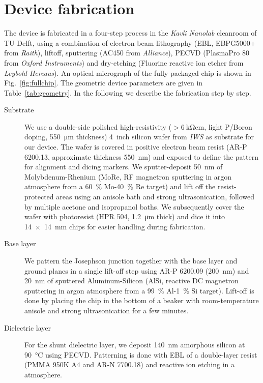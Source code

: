 \section{Device fabrication}\label{sec:fabrication}

% 
The device is fabricated in a four-step process in the \textit{Kavli Nanolab} cleanroom of TU Delft, using a combination of electron beam lithography (EBL, EBPG5000+ from \textit{Raith}), liftoff, sputtering (AC450 from \textit{Alliance}), PECVD (PlasmaPro 80 from \textit{Oxford Instruments}) and dry-etching (Fluorine reactive ion etcher from \textit{Leybold Hereaus}).
% 
An optical micrograph of the fully packaged chip is shown in Fig.~\ref{fig:fullchip}.
% 
The geometric device parameters are given in Table~\ref{tab:geometry}.
% 
In the following we describe the fabrication step by step.
\begin{description}
	\item[Substrate] We use a double-side polished high-resistivity ($>\SI{6}{\kilo\ohm\centi\meter}$, light P/Boron doping, \SI{550}{\micro\meter} thickness) \SI{4}{inch} silicon wafer from \textit{IWS} as substrate for our device.
	The wafer is covered in positive electron beam resist (AR-P 6200.13, approximate thickness \SI{550}{\nano\meter}) and exposed to define the pattern for alignment and dicing markers.
	We sputter-deposit \SI{50}{\nano\meter} of Molybdenum-Rhenium (MoRe, RF magnetron sputtering in argon atmosphere from a \SI{60}{\percent} Mo-\SI{40}{\percent} Re target) and lift off the resist-protected areas using an anisole bath and strong ultrasonication, followed by multiple acetone and isopropanol baths.
	We subsequently cover the wafer with photoresist (HPR 504, \SI{1.2}{\micro\meter} thick) and dice it into \SI{14x14}{\milli\meter} chips for easier handling during fabrication.
	\item[Base layer] We pattern the Josephson junction together with the base layer and ground planes in a single lift-off step using AR-P 6200.09 (\SI{200}{\nano\meter}) and \SI{20}{\nano\meter} of sputtered Aluminum-Silicon (AlSi, reactive DC magnetron sputtering in argon atmosphere from a \SI{99}{\percent} Al-\SI{1}{\percent} Si target).
	Lift-off is done by placing the chip in the bottom of a beaker with room-temperature anisole and strong ultrasonication for a few minutes.
	\item[Dielectric layer] For the shunt dielectric layer, we deposit \SI{140}{\nano\meter} amorphous silicon at \SI{90}{\celsius} using PECVD.
	Patterning is done with EBL of a double-layer resist (PMMA 950K A4 and AR-N 7700.18) and reactive ion etching in a  atmosphere.

\end{description}

